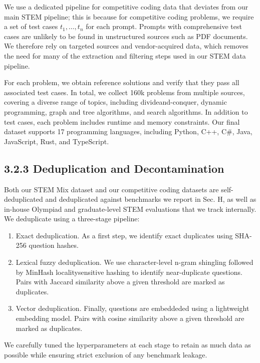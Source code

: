 \documentclass[
  10
]{article}
\begin{document}
We use a dedicated pipeline for competitive coding data that deviates
from our main STEM pipeline; this is because for competitive coding
problems, we require a set of test cases
\(t _ { 1 } , \ldots , t _ { n }\) for each prompt. Prompts with
comprehensive test cases are unlikely to be found in unstructured
sources such as PDF documents. We therefore rely on targeted sources and
vendor-acquired data, which removes the need for many of the extraction
and filtering steps used in our STEM data pipeline.

For each problem, we obtain reference solutions and verify that they
pass all associated test cases. In total, we collect 160k problems from
multiple sources, covering a diverse range of topics, including
divideand-conquer, dynamic programming, graph and tree algorithms, and
search algorithms. In addition to test cases, each problem includes
runtime and memory constraints. Our final dataset supports 17
programming languages, including Python, C++, C\#, Java, JavaScript,
Rust, and TypeScript.

\subsection{3.2.3 Deduplication and
Decontamination}\label{deduplication-and-decontamination}

Both our STEM Mix dataset and our competitive coding datasets are
self-deduplicated and deduplicated against benchmarks we report in Sec.
H, as well as in-house Olympiad and graduate-level STEM evaluations that
we track internally. We deduplicate using a three-stage pipeline:

\begin{enumerate}
\def\labelenumi{\arabic{enumi}.}
\item
  Exact deduplication. As a first step, we identify exact duplicates
  using SHA-256 question hashes.
\item
  Lexical fuzzy deduplication. We use character-level n-gram shingling
  followed by MinHash localitysensitive hashing to identify
  near-duplicate questions. Pairs with Jaccard similarity above a given
  threshold are marked as duplicates.
\item
  Vector deduplication. Finally, questions are embeddeded using a
  lightweight embedding model. Pairs with cosine similarity above a
  given threshold are marked as duplicates.
\end{enumerate}

We carefully tuned the hyperparameters at each stage to retain as much
data as possible while ensuring strict exclusion of any benchmark
leakage.
\end{document}
